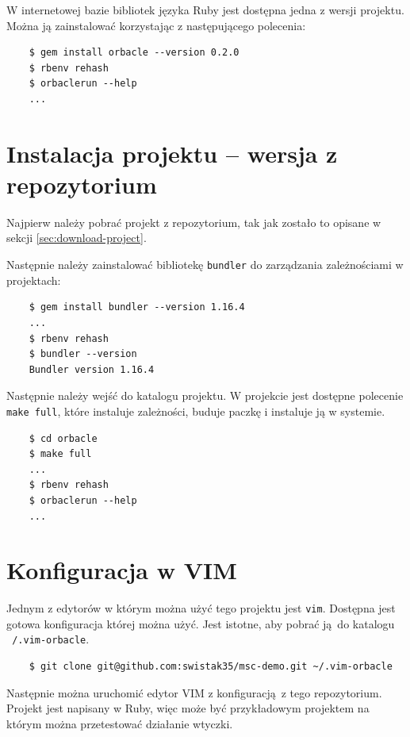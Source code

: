 \documentclass[shortabstract,mgr]{iithesis}
\begin{document}
\begin{appendices}
W internetowej bazie bibliotek języka Ruby jest dostępna jedna z wersji projektu. Można ją zainstalować korzystając z następującego polecenia:

\begin{lstlisting}
    $ gem install orbacle --version 0.2.0
    $ rbenv rehash
    $ orbaclerun --help
    ...
\end{lstlisting}

\section{Instalacja projektu -- wersja z repozytorium}

Najpierw należy pobrać projekt z repozytorium, tak jak zostało to opisane w sekcji \ref{sec:download-project}.

Następnie należy zainstalować bibliotekę \texttt{bundler} do zarządzania zależnościami w projektach:

\begin{lstlisting}
    $ gem install bundler --version 1.16.4
    ...
    $ rbenv rehash
    $ bundler --version
    Bundler version 1.16.4
\end{lstlisting}

Następnie należy wejść do katalogu projektu. W projekcie jest dostępne polecenie \texttt{make full}, które instaluje zależności, buduje paczkę i instaluje ją w systemie.

\begin{lstlisting}
    $ cd orbacle
    $ make full
    ...
    $ rbenv rehash
    $ orbaclerun --help
    ...
\end{lstlisting}

\section{Konfiguracja w VIM}

Jednym z edytorów w którym można użyć tego projektu jest \texttt{vim}. Dostępna jest gotowa konfiguracja której można użyć. Jest istotne, aby pobrać ją do katalogu \texttt{~/.vim-orbacle}.

\begin{lstlisting}
    $ git clone git@github.com:swistak35/msc-demo.git ~/.vim-orbacle
\end{lstlisting}

Następnie można uruchomić edytor VIM z konfiguracją z tego repozytorium. Projekt jest napisany w Ruby, więc może być przykładowym projektem na którym można przetestować działanie wtyczki.


\end{appendices}
\end{document}
